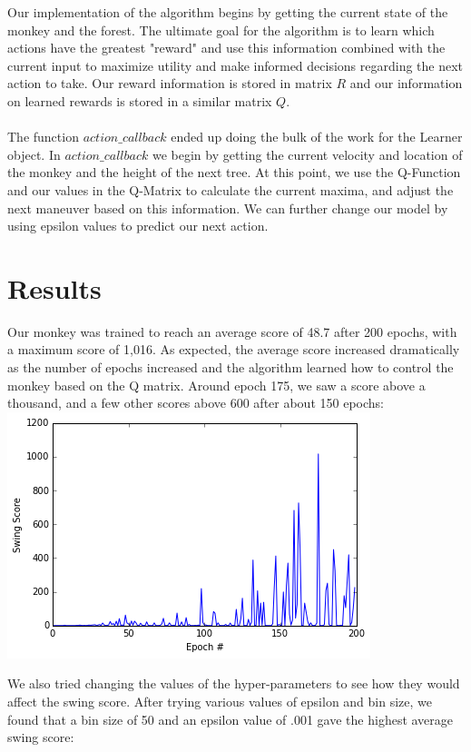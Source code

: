 \documentclass{article}
\begin{document}
Our implementation of the algorithm begins by getting the current state of the monkey and the forest. The ultimate goal for the algorithm is to learn which actions have the greatest "reward" and use this information combined with the current input to maximize utility and make informed decisions regarding the next action to take. Our reward information is stored in matrix $R$ and our information on learned rewards is stored in a similar matrix $Q$.\\\\
The function $action\_callback$ ended up doing the bulk of the work for the Learner object. In $action\_callback$ we begin by getting the current velocity and location of the monkey and the height of the next tree. At this point, we use the Q-Function and our values in the Q-Matrix to calculate the current maxima, and adjust the next maneuver based on this information. We can further change our model by using epsilon values to predict our next action. 
\section{Results}
Our monkey was trained to reach an average score of 48.7 after 200 epochs, with a maximum score of 1,016.  As expected, the average score increased dramatically as the number of epochs increased and the algorithm learned how to control the monkey based on the Q matrix. Around epoch 175, we saw a score above a thousand, and a few other scores above 600 after about 150 epochs:  \\

\includegraphics[scale=.7]{score_epoch.png}

We also tried changing the values of the  hyper-parameters to see how they would affect the swing score.  After trying various values of epsilon and bin size, we found that a bin size of 50 and an epsilon value of .001 gave the highest average swing score:  
\end{document}
